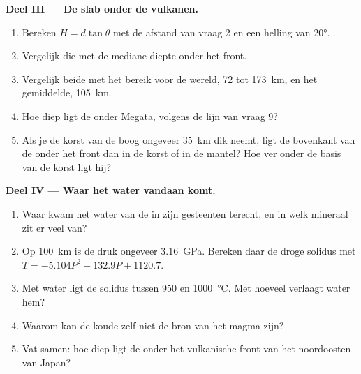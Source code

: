 \begin{problem}
\medskip
\noindent\textbf{Deel III --- De slab onder de vulkanen.}
\begin{enumerate}[resume]
  \item Bereken $H = d\tan\theta$ met de afstand van vraag 2 en een helling
        van \ang{20}.
  \item Vergelijk die met de mediane diepte onder het front.
  \item Vergelijk beide met het bereik voor de wereld, 72 tot \qty{173}{km}, en het gemiddelde,
        \qty{105}{km}.
  \item Hoe diep ligt de  onder Megata, volgens de lijn van vraag 9?
  \item Als je de korst van de boog ongeveer \qty{35}{km} dik neemt, ligt de
        bovenkant van de  onder het front dan in de korst of in de mantel? Hoe
        ver onder de basis van de korst ligt hij?
\end{enumerate}

\medskip
\noindent\textbf{Deel IV --- Waar het water vandaan komt.}
\begin{enumerate}[resume]
  \item Waar kwam het water van de  in zijn gesteenten terecht, en in welk
        mineraal zit er veel van?
  \item Op \qty{100}{km} is de druk ongeveer \qty{3.16}{GPa}. Bereken daar de
        droge solidus met $T = -5.104P^2 + 132.9P + 1120.7$.
  \item Met water ligt de solidus tussen 950 en \qty{1000}{\celsius}.
        Met hoeveel verlaagt water hem?
  \item Waarom kan de koude  zelf niet de bron van het magma zijn?
  \item Vat samen: hoe diep ligt de  onder het vulkanische front van het noordoosten van
        Japan?
\end{enumerate}
\end{problem}
